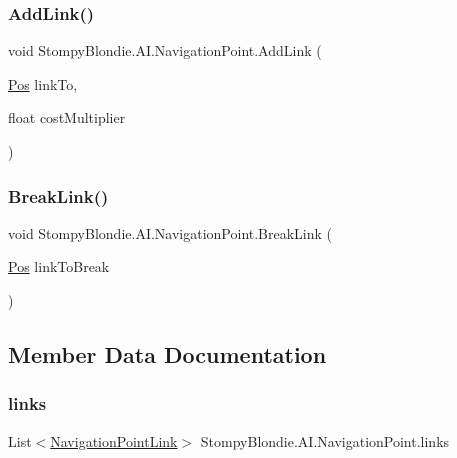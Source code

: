 \subsubsection{\texorpdfstring{Add\+Link()}{AddLink()}}
{\footnotesize\ttfamily void Stompy\+Blondie.\+A\+I.\+Navigation\+Point.\+Add\+Link (\begin{DoxyParamCaption}\item[{\mbox{\hyperlink{struct_stompy_blondie_1_1_common_1_1_types_1_1_pos}{Pos}}}]{link\+To,  }\item[{float}]{cost\+Multiplier }\end{DoxyParamCaption})\hspace{0.3cm}{\ttfamily [inline]}}

\mbox{\label{struct_stompy_blondie_1_1_a_i_1_1_navigation_point_a64ecccc4561cfa8073b2afbd6fa1bacf}} 
\subsubsection{\texorpdfstring{Break\+Link()}{BreakLink()}}
{\footnotesize\ttfamily void Stompy\+Blondie.\+A\+I.\+Navigation\+Point.\+Break\+Link (\begin{DoxyParamCaption}\item[{\mbox{\hyperlink{struct_stompy_blondie_1_1_common_1_1_types_1_1_pos}{Pos}}}]{link\+To\+Break }\end{DoxyParamCaption})\hspace{0.3cm}{\ttfamily [inline]}}



\subsection{Member Data Documentation}
\mbox{\label{struct_stompy_blondie_1_1_a_i_1_1_navigation_point_a66d3f456267553476dfc34c0ebf9f9e2}} 
\subsubsection{\texorpdfstring{links}{links}}
{\footnotesize\ttfamily List$<$\mbox{\hyperlink{struct_stompy_blondie_1_1_a_i_1_1_navigation_point_link}{Navigation\+Point\+Link}}$>$ Stompy\+Blondie.\+A\+I.\+Navigation\+Point.\+links}

